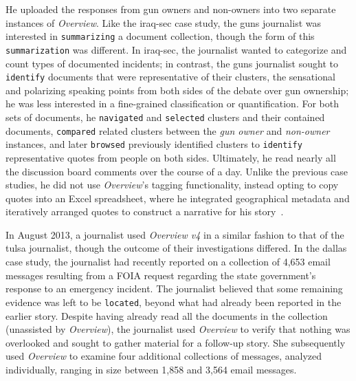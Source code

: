 He uploaded the responses from gun owners and non-owners into two separate instances of {\it Overview}.
Like the {\sc iraq-sec} case study, the {\sc guns} journalist was interested in {\tt summarizing} a document collection, though the form of this {\tt summarization} was different. 
In {\sc iraq-sec}, the journalist wanted to categorize and count types of documented incidents; in contrast, the {\sc guns} journalist sought to {\tt identify} documents that were representative of their clusters, the sensational and polarizing speaking points from both sides of the debate over gun ownership; he was less interested in a fine-grained classification or quantification.
For both sets of documents, he {\tt navigated} and {\tt selected} clusters and their contained documents, {\tt compared} related clusters between the {\it gun owner} and {\it non-owner} instances, and later {\tt browsed} previously identified clusters to {\tt identify} representative quotes from people on both sides.
Ultimately, he read nearly all the discussion board comments over the course of a day.
Unlike the previous case studies, he did not use {\it Overview}'s tagging functionality, instead opting to copy quotes into an Excel spreadsheet, where he integrated geographical metadata and iteratively arranged quotes to construct a narrative for his story~\cite{Keller2012}.

In August 2013, a journalist used {\it Overview v4} in a similar fashion to that of the {\sc tulsa} journalist, though the outcome of their investigations differed. 
In the {\sc dallas} case study, the journalist had recently reported on a collection of 4,653 email messages resulting from a \ac{FOIA} request regarding the state government's response to an emergency incident.
The journalist believed that some remaining evidence was left to be {\tt located}, beyond what had already been reported in the earlier story.
Despite having already read all the documents in the collection (unassisted by {\it Overview}), the journalist used {\it Overview} to verify that nothing was overlooked and sought to gather material for a follow-up story.
She subsequently used {\it Overview} to examine four additional collections of messages, analyzed individually, ranging in size between 1,858 and 3,564 email messages.

